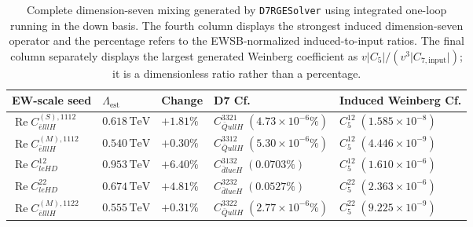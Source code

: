 \begin{table}[htbp]
    \centering
    \renewcommand{\arraystretch}{1.25}
    \begin{tabular}{lllll}
        \toprule
        EW-scale seed
        & \(\Lambda_{\mathrm{est}}\)
        & Change
        & D7 Cf.
        & Induced Weinberg Cf.
        \\
        \midrule
        \(\operatorname{Re}C_{\bar elllH}^{(S),1112}\)
        & \(0.618\,\mathrm{TeV}\)
        & \(+1.81\%\)
        & \(C_{\bar Q ullH}^{3321}\;(4.73\times10^{-6}\%)\)
        & \(C_{5}^{12}\;(1.585\times10^{-8})\)
        \\
        \(\operatorname{Re}C_{\bar elllH}^{(M),1112}\)
        & \(0.540\,\mathrm{TeV}\)
        & \(+0.30\%\)
        & \(C_{\bar Q ullH}^{3312}\;(5.30\times10^{-6}\%)\)
        & \(C_{5}^{12}\;(4.446\times10^{-9})\)
        \\
        \(\operatorname{Re}C_{leHD}^{12}\)
        & \(0.953\,\mathrm{TeV}\)
        & \(+6.40\%\)
        & \(C_{\bar d lueH}^{3132}\;(0.0703\%)\)
        & \(C_{5}^{12}\;(1.610\times10^{-6})\)
        \\
        \(\operatorname{Re}C_{leHD}^{22}\)
        & \(0.674\,\mathrm{TeV}\)
        & \(+4.81\%\)
        & \(C_{\bar d lueH}^{3232}\;(0.0527\%)\)
        & \(C_{5}^{22}\;(2.363\times10^{-6})\)
        \\
        \(\operatorname{Re}C_{\bar elllH}^{(M),1122}\)
        & \(0.555\,\mathrm{TeV}\)
        & \(+0.31\%\)
        & \(C_{\bar Q ullH}^{3322}\;(2.77\times10^{-6}\%)\)
        & \(C_{5}^{22}\;(9.225\times10^{-9})\)
        \\
        \bottomrule
    \end{tabular}%
    \caption{%
        Complete dimension-seven mixing generated by
        \texttt{D7RGESolver} using integrated one-loop running in the down
        basis. The fourth column displays the strongest induced dimension-seven operator and the percentage refers to the EWSB-normalized
        induced-to-input ratios. The final column separately displays the
        largest generated Weinberg coefficient as
        \(v\lvert C_5\rvert/(v^3\lvert C_{7,\mathrm{input}}\rvert)\);
        it is a dimensionless ratio rather than a percentage.
    }
    \label{tab:smeft-rge-mixing-d7}
\end{table}

